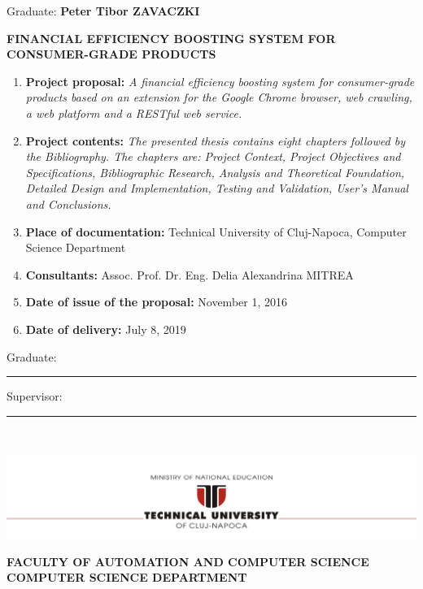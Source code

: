 \documentclass[12pt,a4paper,twoside]{report}
\renewcommand{\thesisauthor}{Peter Tibor ZAVACZKI}    %
\renewcommand{\thesistitle}{FINANCIAL EFFICIENCY BOOSTING SYSTEM FOR CONSUMER-GRADE PRODUCTS}
\renewcommand{\thesissupervisor}{Assoc. Prof. Dr. Eng. Delia Alexandrina MITREA}
\newcommand{\department}{\bf FACULTY OF AUTOMATION AND COMPUTER SCIENCE\\
COMPUTER SCIENCE DEPARTMENT}
\newcommand{\utcnlogo}{\includegraphics[width=15cm]{img/tucn.jpg}}
\newcommand{\uline}[1]{\rule[0pt]{#1}{0.4pt}}
\begin{document}
\vspace{1.6cm}

\begin{center}
  Graduate: {\bf \thesisauthor}

  \vspace{0.6cm}

  {\bf \thesistitle}
\end{center}

\vspace{1cm}

\begin{enumerate}
  \item {\bf Project proposal:} {\it A financial efficiency boosting system for consumer-grade products based on an extension for the Google Chrome browser, web crawling, a web platform and a RESTful web service.}
  \item {\bf Project contents:} {\it The presented thesis contains eight chapters followed by the Bibliography. The chapters are: Project Context, Project Objectives and Specifications, Bibliographic Research, Analysis and Theoretical Foundation, Detailed Design and Implementation, Testing and Validation, User's Manual and Conclusions.}
  \item {\bf Place of documentation:} Technical University of Cluj-Napoca, Computer Science Department
  \item {\bf Consultants:} \thesissupervisor
  \item {\bf Date of issue of the proposal:} November 1, 2016
  \item {\bf Date of  delivery:} July 8, 2019
\end{enumerate}

\vspace{1.2cm}
\hspace{6cm} Graduate: \uline{6cm}

\vspace{0.5cm}
\hspace{6cm} Supervisor: \uline{6cm}

\thispagestyle{empty}
\newpage
$ $


\thispagestyle{empty}
\newpage

\begin{center}
  \utcnlogo

  \department
\end{center}
\end{document}
